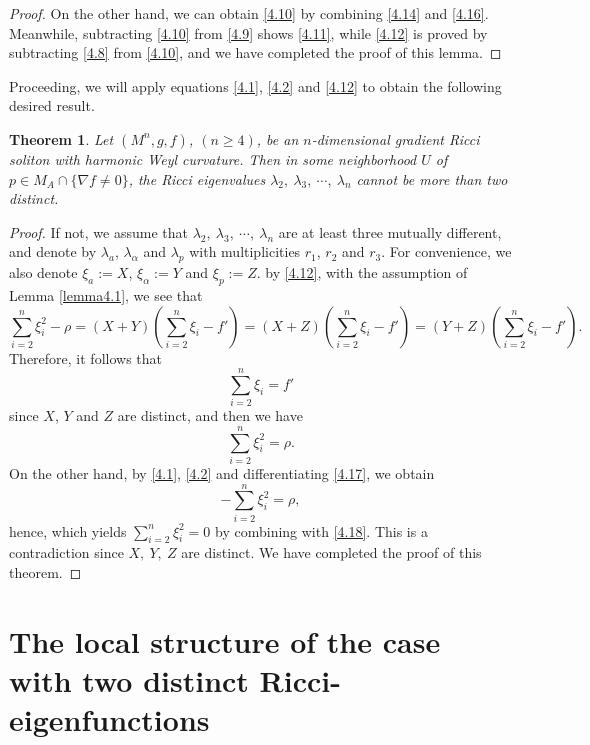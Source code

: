 \documentclass{amsart}
\newtheorem{theorem}{Theorem}[section]
\theoremstyle{definition}
\theoremstyle{remark}
\numberwithin{equation}{section}
\begin{document}
\begin{proof}
On the other hand, we can obtain \eqref{4.10} by combining \eqref{4.14} and \eqref{4.16}.
Meanwhile, subtracting \eqref{4.10} from \eqref{4.9} shows \eqref{4.11}, while \eqref{4.12} is proved by subtracting \eqref{4.8} from \eqref{4.10}, and we have completed the proof of this lemma.
\end{proof}	
	
Proceeding, we will apply equations \eqref{4.1}, \eqref{4.2} and \eqref{4.12} to obtain the following desired result.		
\begin{theorem}\label{thm4.1}
Let $(M^n, g, f)$, $(n\geq 4)$, be an $n$-dimensional gradient Ricci soliton with harmonic Weyl curvature.
 Then in some neighborhood $U$ of $p \in M_A \cap \{ \nabla f \neq 0  \}$, the Ricci eigenvalues $\lambda_2,~\lambda_3,~\cdots,~\lambda_n$ cannot be more than two distinct. 
\end{theorem}
	
\begin{proof}
If not, we assume that $\lambda_2,~\lambda_3,~\cdots,~\lambda_n$ are at least three mutually different, and denote by $\lambda_a$, $\lambda_\alpha$ and $\lambda_p$ with multiplicities $r_1$, $r_2$ and $r_3$.
For convenience, we also denote $\xi_a:=X$, $\xi_\alpha:=Y$ and  $\xi_{p}:=Z$. by \eqref{4.12}, with the assumption of Lemma \ref{lemma4.1}, we see that
\[
\sum^n_{i=2}\xi^2_i-\rho=(X+Y)\left( \sum^n_{i=2}\xi_i -f' \right)
=(X+Z)\left( \sum^n_{i=2}\xi_i -f' \right)
=(Y+Z)\left( \sum^n_{i=2}\xi_i -f' \right).
\]
Therefore, it follows that
\begin{equation}\label{4.17}
\sum^n_{i=2}\xi_i =f' 
\end{equation}
since $X$, $Y$ and $Z$ are distinct, and then we have
\begin{equation}\label{4.18}
\sum^n_{i=2}\xi^2_i =\rho.
\end{equation}
 On the other hand, by \eqref{4.1}, \eqref{4.2} and differentiating \eqref{4.17}, we obtain 
\[
-\sum^n_{i=2}\xi^2_i =\rho,
\]
hence, which yields $\sum^n_{i=2}\xi^2_i=0$ by combining with \eqref{4.18}.
This is a contradiction since $X,~Y,~Z$ are distinct.
We have completed the proof of this theorem. 
\end{proof}

	
	
\section{The local structure of the case with two distinct Ricci-eigenfunctions}
	
\end{document}
